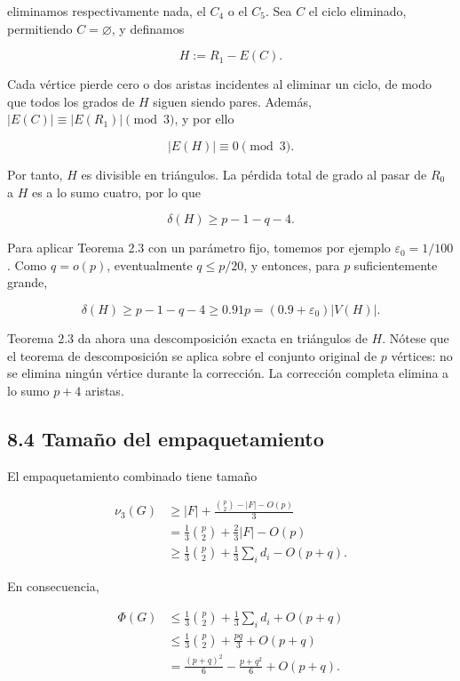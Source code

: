 \documentclass[
  11pt,
]{article}
\begin{document}
eliminamos respectivamente nada, el \(C_4\) o el \(C_5\). Sea \(C\) el
ciclo eliminado, permitiendo \(C=\varnothing\), y definamos

\[
H:=R_1-E(C).
\]

Cada vértice pierde cero o dos aristas incidentes al eliminar un ciclo,
de modo que todos los grados de \(H\) siguen siendo pares. Además,
\(|E(C)|\equiv |E(R_1)|\pmod3\), y por ello

\[
|E(H)|\equiv0\pmod3.
\]

Por tanto, \(H\) es divisible en triángulos. La pérdida total de grado
al pasar de \(R_0\) a \(H\) es a lo sumo cuatro, por lo que

\[
\delta(H)\ge p-1-q-4.
\tag{8.8}
\]

Para aplicar Teorema 2.3 con un parámetro fijo, tomemos por ejemplo
\(\varepsilon_0=1/100\). Como \(q=o(p)\), eventualmente \(q\le p/20\), y
entonces, para \(p\) suficientemente grande,

\[
\delta(H)\ge p-1-q-4\ge0.91p=(0.9+\varepsilon_0)|V(H)|.
\tag{8.9}
\]

Teorema 2.3 da ahora una descomposición exacta en triángulos de \(H\).
Nótese que el teorema de descomposición se aplica sobre el conjunto
original de \(p\) vértices: no se elimina ningún vértice durante la
corrección. La corrección completa elimina a lo sumo \(p+4\) aristas.

\subsection{8.4 Tamaño del
empaquetamiento}\label{tamauxf1o-del-empaquetamiento}

El empaquetamiento combinado tiene tamaño

\[
\begin{aligned}
\nu_3(G)
&\ge
|F|+\frac{\binom p2-|F|-O(p)}3\\
&=
\frac13\binom p2+\frac23|F|-O(p)\\
&\ge
\frac13\binom p2+\frac13\sum_i d_i-O(p+q).
\end{aligned}
\tag{8.10}
\]

En consecuencia,

\[
\begin{aligned}
\Phi(G)
&\le
\frac13\binom p2+\frac13\sum_i d_i+O(p+q)\\
&\le
\frac13\binom p2+\frac{pq}{3}+O(p+q)\\
&=
\frac{(p+q)^2}{6}-\frac{p+q^2}{6}+O(p+q).
\end{aligned}
\tag{8.11}
\]
\end{document}
